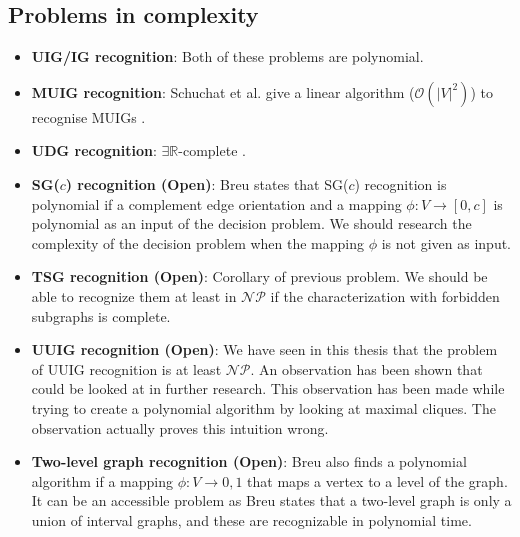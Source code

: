 \begin{appendices}
  \chapter{Problems in complexity}
    \begin{itemize}
      \item \textbf{UIG/IG recognition}: Both of these problems are polynomial.
      \item \textbf{MUIG recognition}: Schuchat et al. give a linear algorithm ($\mathcal{O}(|V|^2)$) to recognise MUIGs \cite{shuchatUnitMixedInterval2014}.
      \item \textbf{UDG recognition}: $\exists\mathbb{R}$-complete \cite{ExistentialTheoryReals2006}.
      \item \textbf{SG($c$) recognition (Open)}: Breu  \cite{breuAlgorithmicAspectsConstrained1996} states that SG($c$) recognition is polynomial if a complement edge orientation and a mapping $\phi : V \to [0,c]$ is polynomial as an input of the decision problem. We should research the complexity of the decision problem when the mapping $\phi$ is not given as input.
      \item \textbf{TSG recognition (Open)}: Corollary of previous problem. We should be able to recognize them at least in $\mathcal{NP}$ if the characterization with forbidden subgraphs is complete.
      \item \textbf{UUIG recognition (Open)}: We have seen in this thesis that the problem of UUIG recognition is at least $\mathcal{NP}$. An observation has been shown that could be looked at in further research. This observation has been made while trying to create a polynomial algorithm by looking at maximal cliques. The observation actually proves this intuition wrong.
      \item \textbf{Two-level graph recognition (Open)}: Breu \cite{breuAlgorithmicAspectsConstrained1996} also finds a polynomial algorithm if a mapping $\phi: V \to {0,1}$ that maps a vertex to a level of the graph. It can be an accessible problem as Breu states that a two-level graph is only a union of interval graphs, and these are recognizable in polynomial time.
    \end{itemize}

\end{appendices}
